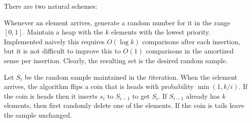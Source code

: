 There are two natural schemes:
\medskip
\begin{compactenumA}
    \item Whenever an element arrives, generate a random number for it
    in the range $[0,1]$. Maintain a heap with the $k$ elements with
    the lowest priority. Implemented naively this requires
    $O( \log k)$ comparisons after each insertion, but it is not
    difficult to improve this to $O(1)$ comparisons in the amortized
    sense per insertion. Clearly, the resulting set is the desired
    random sample.
    
    \medskip
    \item {} %
    Let $S_t$ be the random sample maintained in the $t$\th iteration.
    When the $i$\th element arrives, the algorithm flips a coin that is
    heads with probability $\min(1,k/i)$. If the coin is heads then it
    inserts $s_i$ to $S_{i-1}$ to get $S_i$. If $S_{i-1}$ already has
    $k$ elements, then first randomly delete one of the elements.
    If the coin is tails leave the sample unchanged.
\end{compactenumA}


